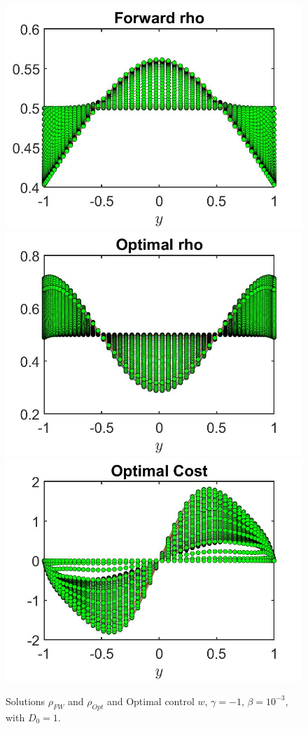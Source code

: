 \documentclass[11pt, a4paper]{article}
\theoremstyle{definition}
\begin{document}
\begin{figure}[h]
	\includegraphics[scale=0.3]{rhoFWt2.jpg}	\includegraphics[scale=0.3]{rhoOptt2.jpg}
	\includegraphics[scale=0.3]{wOpt2.jpg}
	\caption{Solutions $\rho_{FW}$ and $\rho_{Opt}$ and Optimal control $w$, $\gamma = -1$, $\beta = 10^{-3}$, with $D_0 = 1$.}
	\label{rhot2}
\end{figure}
\end{document}
